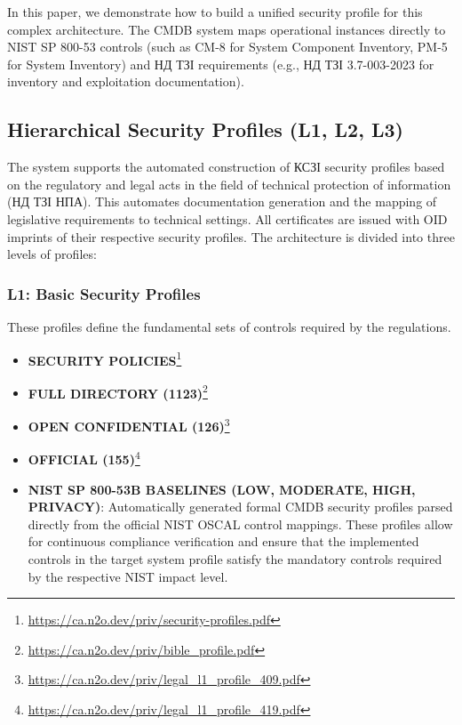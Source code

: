 \documentclass{article}
\begin{document}
In this paper, we demonstrate how to build a unified security profile for this complex architecture.
The CMDB system maps operational instances directly to NIST SP 800-53 controls (such as CM-8 for
System Component Inventory, PM-5 for System Inventory) and \foreignlanguage{ukrainian}{НД \foreignlanguage{ukrainian}{ТЗІ}}
requirements (e.g., \foreignlanguage{ukrainian}{\foreignlanguage{ukrainian}{НД \foreignlanguage{ukrainian}{ТЗІ}} 3.7-003-2023}
for inventory and exploitation documentation).

\subsection{Hierarchical Security Profiles (L1, L2, L3)}
The system supports the automated construction of \foreignlanguage{ukrainian}{КСЗІ} security profiles
based on the regulatory and legal acts in the field of technical protection of
information (\foreignlanguage{ukrainian}{\foreignlanguage{ukrainian}{НД \foreignlanguage{ukrainian}{ТЗІ}} \foreignlanguage{ukrainian}{НПА}}).
This automates documentation generation and the mapping of legislative requirements to technical settings.
All certificates are issued with OID imprints of their respective security profiles.
The architecture is divided into three levels of profiles:

\newpage
\subsubsection{L1: Basic Security Profiles}
These profiles define the fundamental sets of controls required by the regulations.
\begin{itemize}
    \item \textbf{SECURITY POLICIES}\footnote{\url{https://ca.n2o.dev/priv/security-profiles.pdf}}
    \item \textbf{FULL DIRECTORY (1123)}\footnote{\url{https://ca.n2o.dev/priv/bible_profile.pdf}}
    \item \textbf{OPEN CONFIDENTIAL (126)}\footnote{\url{https://ca.n2o.dev/priv/legal_l1_profile_409.pdf}}
    \item \textbf{OFFICIAL (155)}\footnote{\url{https://ca.n2o.dev/priv/legal_l1_profile_419.pdf}}
    \item \textbf{NIST SP 800-53B BASELINES (LOW, MODERATE, HIGH, PRIVACY)}: Automatically generated formal CMDB security profiles parsed directly from the official NIST OSCAL control mappings. These profiles allow for continuous compliance verification and ensure that the implemented controls in the target system profile satisfy the mandatory controls required by the respective NIST impact level.
\end{itemize}
\end{document}
